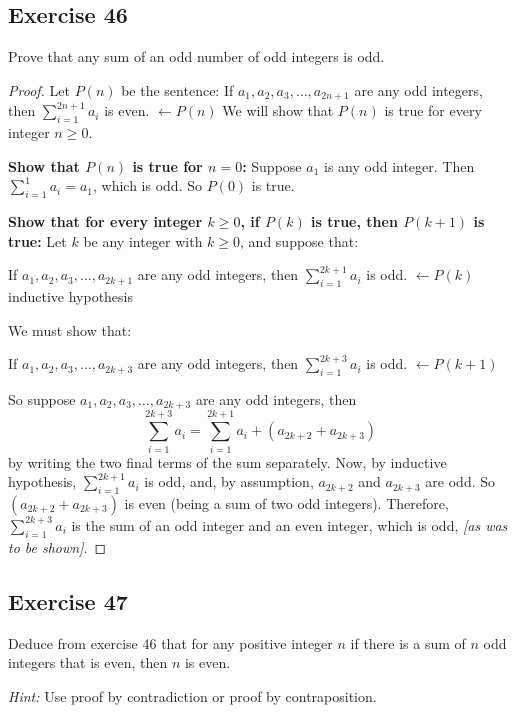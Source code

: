 \documentclass[14pt]{extarticle}
\newcommand{\from}{\leftarrow}
\newcommand{\cy}{\color{cyan}}
\begin{document}
    \subsection{Exercise 46}
    Prove that any sum of an odd number of odd integers is odd.

    \begin{proof}
        Let $P(n)$ be the sentence: If \(a_1, a_2, a_3, \ldots, a_{2n+1}\) are any odd integers, then
        \(\sum_{i=1}^{2n+1} a_i\) is even. {\cy \(\from P(n)\)}
        We will show that $P(n)$ is true for every integer \(n \geq 0\).

            {\bf Show that $P(n)$ is true for $n = 0$:} Suppose $a_1$ is any odd integer. Then \(\sum_{i = 1}^1 a_i = a_1\),
        which is odd. So $P(0)$ is true.

            {\bf Show that for every integer \(k \geq 0\), if $P(k)$ is true, then $P(k + 1)$ is true:} Let $k$ be any integer with
        \(k \geq 0\), and suppose that:

        If \(a_1, a_2, a_3, \ldots, a_{2k+1}\) are any odd integers, then \(\sum_{i = 1}^{2k+1} a_i\) is odd. {\cy \(\from P(k)\) inductive hypothesis}

        We must show that:

        If \(a_1, a_2, a_3, \ldots, a_{2k+3}\) are any odd integers, then \(\sum_{i = 1}^{2k+3} a_i\) is odd.
            {\cy \(\from P(k + 1)\)}

        So suppose \(a_1, a_2, a_3, \ldots, a_{2k+3}\) are any odd integers, then
        \[
            \sum_{i = 1}^{2k+3} a_i = \sum_{i = 1}^{2k+1} a_i + (a_{2k+2} + a_{2k+3})
        \]
        by writing the two final terms of the sum separately. Now, by inductive hypothesis, \(\sum_{i = 1}^{2k+1} a_i\) is
        odd, and, by assumption, $a_{2k+2}$ and $a_{2k+3}$ are odd. So \((a_{2k+2} + a_{2k+3})\) is even (being a sum of two
        odd integers). Therefore, \(\sum_{i = 1}^{2k+3} a_i\) is the sum of an odd integer and an even integer, which is
        odd, {\it [as was to be shown]}.
    \end{proof}

    \subsection{Exercise 47}
    Deduce from exercise 46 that for any positive integer $n$ if there is a sum of $n$ odd integers that is even, then $n$ is even.

        {\it Hint:} Use proof by contradiction or proof by contraposition.
\end{document}
